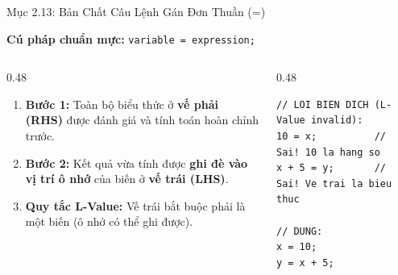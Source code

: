 \documentclass[aspectratio=169, 10pt]{beamer}
\begin{document}
\begin{frame}[fragile]{Mục 2.13: Bản Chất Câu Lệnh Gán Đơn Thuần (=)}
  \begin{block}{\textbf{Cú pháp chuẩn mực:}}
    \centering \Large \texttt{variable = expression;}
  \end{block}

  \begin{columns}[T]
    \begin{column}{0.48\textwidth}
      \begin{tcolorbox}[colback=UniLightBlue!30,colframe=UniBlue,title=\textbf{Quy luật thực thi của máy tính},fonttitle=\small\bfseries]
        \begin{enumerate}\small
          \item \textbf{Bước 1:} Toàn bộ biểu thức ở \textbf{vế phải (RHS)} được đánh giá và tính toán hoàn chỉnh trước.
          \item \textbf{Bước 2:} Kết quả vừa tính được \textbf{ghi đè vào vị trí ô nhớ} của biến ở \textbf{vế trái (LHS)}.
          \item \textbf{Quy tắc L-Value:} Vế trái bắt buộc phải là một biến (ô nhớ có thể ghi được).
        \end{enumerate}
      \end{tcolorbox}
    \end{column}

    \begin{column}{0.48\textwidth}
      \begin{tcolorbox}[colback=AlertRed!10,colframe=AlertRed,title=\textbf{Các lỗi cú pháp kinh điển},fonttitle=\small\bfseries]
\begin{lstlisting}[numbers=none]
// LOI BIEN DICH (L-Value invalid):
10 = x;          // Sai! 10 la hang so
x + 5 = y;       // Sai! Ve trai la bieu thuc

// DUNG:
x = 10;
y = x + 5;
\end{lstlisting}
      \end{tcolorbox}
    \end{column}
  \end{columns}
\end{frame}
\end{document}
